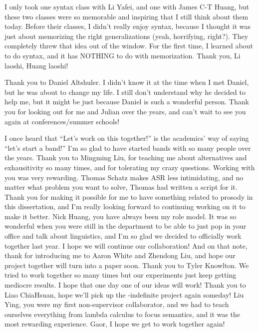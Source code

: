 I only took one syntax class with Li Yafei, and one with James C-T Huang, but these two classes were so memorable and inspiring that I still think about them today. Before their classes, I didn’t really enjoy syntax, because I thought it was just about memorizing the right generalizations (yeah, horrifying, right?). They completely threw that idea out of the window. For the first time, I learned about  to do syntax, and it has NOTHING to do with memorization. Thank you, Li laoshi, Huang laoshi!%

Thank you to Daniel Altshuler. I didn’t know it at the time when I met Daniel, but he was about to change my life. I still don’t understand why he decided to help me, but it might be just because Daniel is such a wonderful person. Thank you for looking out for me and Julian over the years, and can’t wait to see you again at conferences/summer schools!
 
I once heard that “Let’s work on this together!” is the academics’ way of saying “let’s start a band!” I’m so glad to have started bands with so many people over the years. Thank you to Mingming Liu, for teaching me about alternatives and exhausitivity so many times, and for tolerating my crazy questions. Working with you was very rewarding.  Thomas Schatz makes ASR less intimidating, and no matter what problem you want to solve, Thomas had written a script for it. Thank you for making it possible for me to have something related to prosody in this dissertation, and I’m really looking forward to continuing working on it to make it better. Nick Huang, you have always been my role model. It was so wonderful when you were still in the department to be able to just pop in your office and talk about linguistics, and I’m so glad we decided to officially work together last year. I hope we will continue our collaboration! And on that note, thank for introducing me to Aaron White and Zhendong Liu, and hope our project together will turn into a paper soon. Thank you to Tyler Knowlton. We tried to work together so many times but our experiments just keep getting mediocre results. I hope that one day one of our ideas will work! Thank you to Liao ChiaHsuan, hope we’ll pick up the \twh-indefinite project again someday! Liu Ying, you were my first non-supervisor collaborator, and we had to teach ourselves everything from lambda calculus to focus semantics, and it was the most rewarding experience. Gaor, I hope we get to work together again!
 
